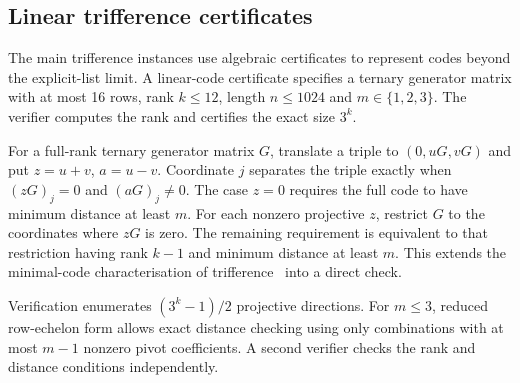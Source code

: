 \subsection{Linear trifference certificates}
\label{app:trifference_certificates}
The main trifference instances use algebraic certificates to represent codes beyond the explicit-list limit. A linear-code certificate specifies a ternary generator matrix with at most 16 rows, rank $k\le12$, length $n\le1024$ and $m\in\{1,2,3\}$. The verifier computes the rank and certifies the exact size $3^k$.
\begin{constructionbox}[title=Hyperplane verification]
For a full-rank ternary generator matrix $G$, translate a triple to $(0,uG,vG)$ and put $z=u+v$, $a=u-v$. Coordinate $j$ separates the triple exactly when $(zG)_j=0$ and $(aG)_j\ne0$. The case $z=0$ requires the full code to have minimum distance at least $m$. For each nonzero projective $z$, restrict $G$ to the coordinates where $zG$ is zero. The remaining requirement is equivalent to that restriction having rank $k-1$ and minimum distance at least $m$. This extends the minimal-code characterisation of trifference~\citep{bishnoi2024trifferent,bishnoi2025generalized} into a direct check.

Verification enumerates $(3^k-1)/2$ projective directions. For $m\le3$, reduced row-echelon form allows exact distance checking using only combinations with at most $m-1$ nonzero pivot coefficients. A second verifier checks the rank and distance conditions independently.
\end{constructionbox}

